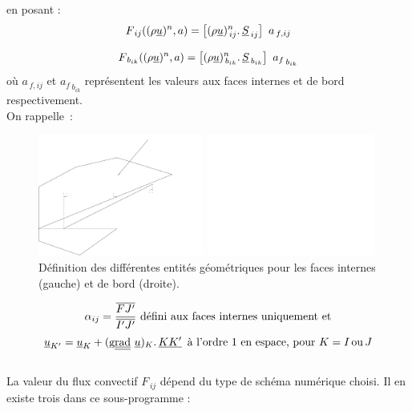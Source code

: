 en posant :
\begin{equation}
F_{\,ij}((\rho \underline{u})^n,a) = \left[{(\rho \underline{u})_{\,ij}^n} \text{.}\, \underline{S}_{\,ij}\right]\ a_{\,f,ij}
\end{equation}

\begin{equation}
F_{\,{b}_{ik}}((\rho \underline{u})^n, a) =  \left[{(\rho \underline{u})_{\,{b}_{ik}}^n} \text{.}\, \underline{S}_{\,{b}_{ik}}\right]\ {a_f}_{\,{b}_{ik}}
\end{equation}
o\`u $a_{\,f,ij}$ et ${a_f}_{\,{b}_{ik}}$ repr\'esentent les valeurs aux faces
internes et de bord respectivement.\\

On rappelle~:\\
\begin{figure}[h]
\hspace*{1cm}\parbox{8cm}{%
\centerline{\includegraphics[height=4cm]{../Base/Bilsc2/Images/facette.pdf}}}
\parbox{8cm}{%
\centerline{\includegraphics[height=4cm]{../Base/Bilsc2/Images/facebord.pdf}}}
\caption{\label{Base_Bilsc2_fig_geom}D\'efinition des diff\'erentes entit\'es
g\'eom\'etriques pour les faces internes (gauche) et de bord (droite).}
\end{figure}
\begin{equation}\notag
\displaystyle\alpha_{ij}=\frac{\overline{FJ'}}{\overline{I'J'}} \text{\ d\'efini aux faces internes uniquement et}
\end{equation}
\begin{equation}\notag
\underline{u}_{K'} = \underline{u}_{K}+(\text{g}\underline{\underline{\text{rad}}}\ {\underline{u}})_K\text{.}\, \underline{KK'}\, \text{\
\`a l'ordre 1 en espace, pour ${K = I \,\text{ou}\, J}$}
\end{equation}\\
La valeur du flux convectif ${F_{\,ij}}$  d\'epend du type de sch\'ema num\'erique choisi. Il en existe trois dans ce sous-programme :



